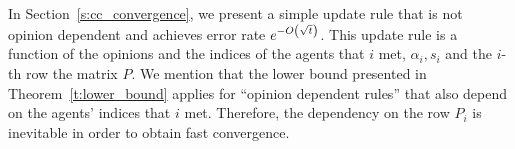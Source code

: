 In Section~\ref{s:cc_convergence}, we present a simple update rule that
is not opinion dependent and  achieves error rate $e^{-O\left(\sqrt{t}\right)}$.
This update rule is a function of the opinions and the indices of the agents
that $i$ met, $\alpha_i,s_i$ and the $i$-th row the matrix $P$.
We mention that the lower bound presented in Theorem~\ref{t:lower_bound}
applies for \enquote{opinion dependent rules} that also depend on the
agents' indices that $i$ met.  Therefore, the dependency on the row $P_i$ is
inevitable in order to obtain fast convergence.
